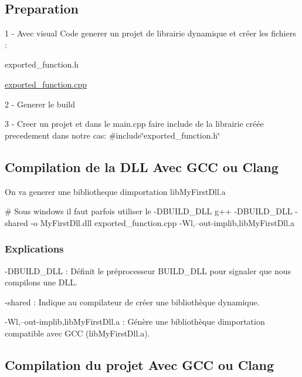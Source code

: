 \subsection*{Preparation}

1 -\/ Avec visual Code generer un projet de librairie dynamique et créer les fichiers \+:


\begin{DoxyItemize}
\item exported\+\_\+function.\+h
\item \hyperlink{exported__function_8cpp}{exported\+\_\+function.\+cpp}
\end{DoxyItemize}

2 -\/ Generer le build

3 -\/ Creer un projet et dans le main.\+cpp faire include de la librairie créée precedement dans notre cas\+: \#include\char`\"{}exported\+\_\+function.\+h\char`\"{}

\subsection*{Compilation de la D\+LL Avec G\+CC ou Clang}

On va generer une bibliotheque d\textquotesingle{}importation lib\+My\+First\+Dll.\+a


\begin{DoxyCode}
# Sous windows il faut parfois utiliser le -DBUILD\_DLL
g++ -DBUILD\_DLL -shared -o MyFirstDll.dll exported\_function.cpp -Wl,--out-implib,libMyFirstDll.a
\end{DoxyCode}


\subsubsection*{Explications}


\begin{DoxyItemize}
\item -\/\+D\+B\+U\+I\+L\+D\+\_\+\+D\+LL \+: Définit le préprocesseur B\+U\+I\+L\+D\+\_\+\+D\+LL pour signaler que nous compilons une D\+LL.
\item -\/shared \+: Indique au compilateur de créer une bibliothèque dynamique.
\item -\/\+Wl,--out-\/implib,lib\+My\+First\+Dll.\+a \+: Génère une bibliothèque d\textquotesingle{}importation compatible avec G\+CC (lib\+My\+First\+Dll.\+a).
\end{DoxyItemize}

\subsection*{Compilation du projet Avec G\+CC ou Clang}

